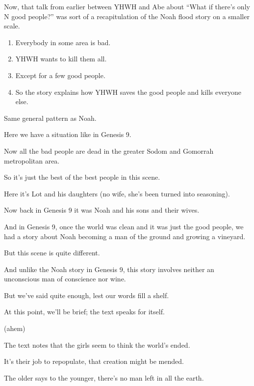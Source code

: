 {
}
{
}
{
	Now, that talk from earlier between YHWH and Abe about ``What if there's only N good people?'' was sort of a recapitulation of the Noah flood story on a smaller scale.

	\begin{enumerate}
	\item Everybody in some area is bad.
	\item YHWH wants to kill them all.
	\item Except for a few good people.
	\item So the story explains how YHWH saves the good people and kills everyone else.
	\end{enumerate}

	Same general pattern as Noah.

	Here we have a situation like in Genesis 9.

	Now all the bad people are dead in the greater Sodom and Gomorrah metropolitan area.

	So it's just the best of the best people in this scene.

	Here it's Lot and his daughters (no wife, she's been turned into seasoning).

	Now back in Genesis 9 it was Noah and his sons and their wives.

	And in Genesis 9, once the world was clean and it was just the good people, we had a story about Noah becoming a man of the ground and growing a vineyard.

	But this scene is quite different.

	And unlike the Noah story in Genesis 9, this story involves neither an unconscious man of conscience nor wine.

	But we've said quite enough, lest our words fill a shelf.

	At this point, we'll be brief; the text speaks for itself.

	(ahem)

	The text notes that the girls seem to think the world's ended.

	It's their job to repopulate, that creation might be mended.

	The older says to the younger, there's no man left in all the earth.
}

